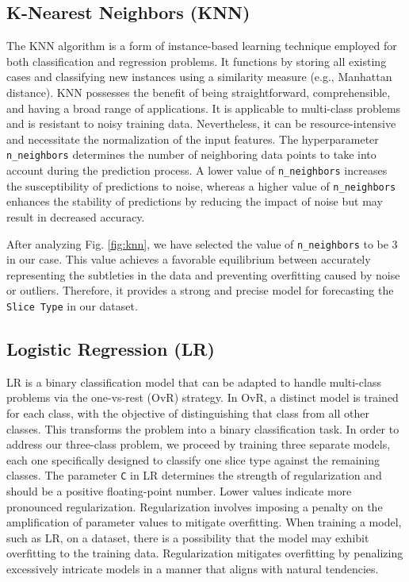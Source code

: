 \documentclass[conference]{IEEEtran}
\begin{document}
\subsection{K-Nearest Neighbors (KNN)}
The KNN algorithm is a form of instance-based learning technique employed for both classification and regression problems. It functions by storing all existing cases and classifying new instances using a similarity measure (e.g., Manhattan distance). KNN possesses the benefit of being straightforward, comprehensible, and having a broad range of applications. It is applicable to multi-class problems and is resistant to noisy training data. Nevertheless, it can be resource-intensive and necessitate the normalization of the input features. The hyperparameter \texttt{\footnotesize n\_neighbors} determines the number of neighboring data points to take into account during the prediction process. A lower value of \texttt{\footnotesize n\_neighbors} increases the susceptibility of predictions to noise, whereas a higher value of \texttt{\footnotesize n\_neighbors} enhances the stability of predictions by reducing the impact of noise but may result in decreased accuracy.

After analyzing Fig. \ref{fig:knn}, we have selected the value of \texttt{\footnotesize n\_neighbors} to be 3 in our case. This value achieves a favorable equilibrium between accurately representing the subtleties in the data and preventing overfitting caused by noise or outliers. Therefore, it provides a strong and precise model for forecasting the \texttt{\footnotesize Slice Type} in our dataset.

\subsection{Logistic Regression (LR)}
LR is a binary classification model that can be adapted to handle multi-class problems via the one-vs-rest (OvR) strategy. In OvR, a distinct model is trained for each class, with the objective of distinguishing that class from all other classes. This transforms the problem into a binary classification task. In order to address our three-class problem, we proceed by training three separate models, each one specifically designed to classify one slice type against the remaining classes. The parameter \texttt{\footnotesize C} in LR determines the strength of regularization and should be a positive floating-point number. Lower values indicate more pronounced regularization. Regularization involves imposing a penalty on the amplification of parameter values to mitigate overfitting. When training a model, such as LR, on a dataset, there is a possibility that the model may exhibit overfitting to the training data. Regularization mitigates overfitting by penalizing excessively intricate models in a manner that aligns with natural tendencies.
\end{document}
